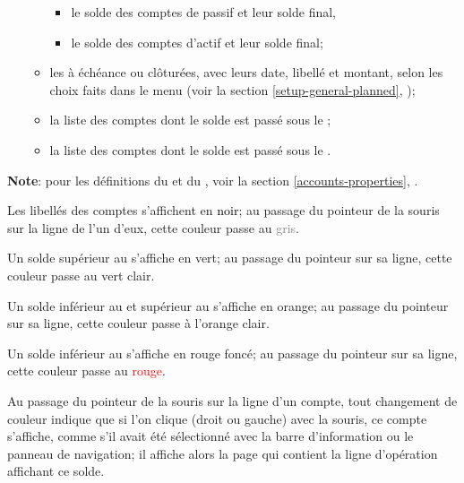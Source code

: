 \begin{itemize}
\begin{itemize}
\begin{itemize}
					\item le solde des comptes de passif et leur solde final,
					\item le solde des comptes d'actif et leur solde final;
				\end{itemize}
			\item les  à échéance ou clôturées, avec leurs date, libellé et montant, selon les choix faits dans le menu  (voir la section \vref{setup-general-planned}, );
			\item la liste des comptes dont le solde est passé sous le ;
			\item la liste des comptes dont le solde est passé sous le .
	\end{itemize}
\end{itemize}


\textbf{Note}: pour les définitions du  et du , voir la section \vref{accounts-properties}, .


Les libellés des comptes s'affichent en \textcolor{black}{noir}; au passage du pointeur de la souris sur la ligne de l'un d'eux, cette couleur passe au \textcolor{gray}{gris}.

Un solde supérieur au  s'affiche en \textcolor[RGB]{0,126,0}{vert}; au passage du pointeur sur sa ligne, cette couleur passe au \textcolor[RGB]{0,227,0}{vert clair}.

Un solde inférieur au  et supérieur au  s'affiche en \textcolor[RGB]{230,155,0}{orange}; au passage du pointeur sur sa ligne, cette couleur passe à l'\textcolor[RGB]{255,200,0}{orange clair}.

Un solde inférieur au  s'affiche en \textcolor[RGB]{153,0,0}{rouge foncé}; au passage du pointeur sur sa ligne, cette couleur passe au \textcolor{red}{rouge}.

Au passage du pointeur de la souris sur la ligne d'un compte, tout changement de couleur indique que si l'on clique (droit ou gauche) avec la souris, ce compte s'affiche, comme s'il avait été sélectionné avec la barre d'information ou le panneau de navigation; il affiche alors la page qui contient la ligne d'opération affichant ce solde.

